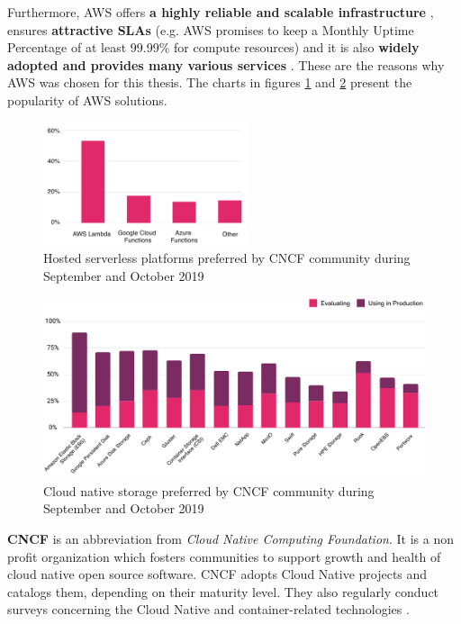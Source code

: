 Furthermore, AWS offers \textbf{a highly reliable and scalable infrastructure} \cite{article-aws-architecting}, ensures \textbf{attractive SLAs} (e.g. AWS promises to keep a Monthly Uptime Percentage of at least 99.99\% for compute resources) \cite{online-aws-sla} and it is also \textbf{widely adopted and provides many various services} \cite{cncf-2019}. These are the reasons why AWS was chosen for this thesis. The charts in figures \ref{fig:cncf-aws-pop1} and \ref{fig:cncf-aws-pop2} present the popularity of AWS solutions.

\begin{figure}[H]
    \centering
    \includegraphics[width=6cm]{figures/cncf-aws-pop1.png}
    \captionsetup{justification=centering,margin=2cm}
    \caption{Hosted serverless platforms preferred by CNCF community during September and October 2019 \cite{cncf-2019}}
    \label{fig:cncf-aws-pop1}
\end{figure}
\begin{figure}[H]
    \centering
    \includegraphics[width=13cm]{figures/cncf-aws-pop2.png}
    \captionsetup{justification=centering,margin=2cm}
    \caption{Cloud native storage preferred by CNCF community during September and October 2019 \cite{cncf-2019}}
    \label{fig:cncf-aws-pop2}
\end{figure}

\textbf{CNCF} is an abbreviation from \textit{Cloud Native Computing Foundation}. It is a non profit organization which fosters communities to support growth and health of cloud native open source software. CNCF adopts Cloud Native projects and catalogs them, depending on their maturity level. They also regularly conduct surveys concerning the Cloud Native and container-related technologies \cite{cncf-services}.



